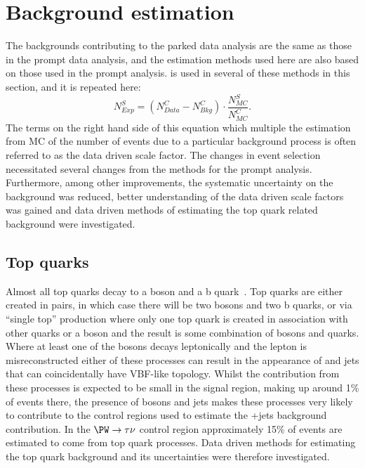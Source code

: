 \section{Background estimation}%
\label{sec:parkedbkg}
The backgrounds contributing to the parked data analysis are the same as those in the prompt data analysis, and the estimation methods used here are also based on those used in the prompt analysis.  is used in several of these methods in this section, and it is repeated here:
\begin{equation}
  \label{eq:wdatabkgrep}
  N^{S}_{Exp}=\left(N^{C}_{Data}-N^{C}_{Bkg}\right)\cdot\frac{N^{S}_{MC}}{N^{C}_{MC}}.
\end{equation}
The terms on the right hand side of this equation which multiple the estimation from \ac{MC} of the number of events due to a particular background process is often referred to as the data driven scale factor. The changes in event selection necessitated several changes from the methods for the prompt analysis. Furthermore, among other improvements, the systematic uncertainty on the \Znunu background was reduced, better understanding of the data driven scale factors was gained and data driven methods of estimating the top quark related background were investigated.

\subsection{Top quarks}%
Almost all top quarks decay to a \PW boson and a b quark~\cite{pdg}. Top quarks are either created in pairs, in which case there will be two \PW bosons and two b quarks, or via ``single top'' production where only one top quark is created in association with other quarks or a \PW boson and the result is some combination of \PW bosons and quarks. Where at least one of the \PW bosons decays leptonically and the lepton is misreconstructed either of these processes can result in the appearance of \MET and jets that can coincidentally have \ac{VBF}-like topology. Whilst the contribution from these processes is expected to be small in the signal region, making up around 1\% of events there, the presence of \PW bosons and jets makes these processes very likely to contribute to the control regions used to estimate the \PW+jets background contribution. In the $\PW\rightarrow\tau\nu$ control region approximately 15\% of events are estimated to come from top quark processes. Data driven methods for estimating the top quark background and its uncertainties were therefore investigated.

